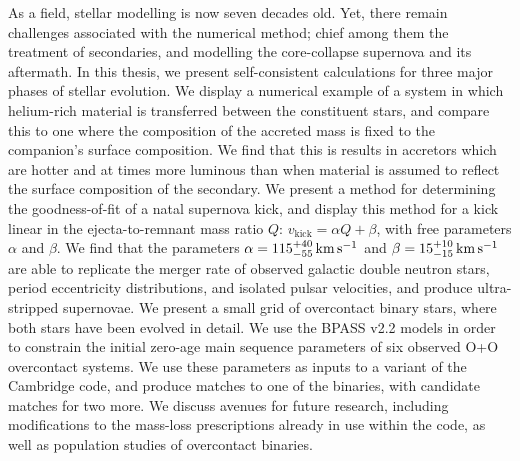 As a field, stellar modelling is now seven decades old. Yet, there remain challenges associated with the numerical method; chief among them the treatment of secondaries, and modelling the core-collapse supernova and its aftermath. In this thesis, we present self-consistent calculations for three major phases of stellar evolution. We display a numerical example of a system in which helium-rich material is transferred between the constituent stars, and compare this to one where the composition of the accreted mass is fixed to the companion's surface composition. We find that this is results in accretors which are hotter and at times more luminous than when material is assumed to reflect the surface composition of the secondary. We present a method for determining the goodness-of-fit of a natal supernova kick, and display this method for a kick linear in the ejecta-to-remnant mass ratio $Q$: $v_\text{kick}=\alpha Q + \beta$, with free parameters $\alpha$ and $\beta$. We find that the parameters $\alpha=\SI[parse-numbers=false]{115^{+40}_{-55}}{\kilo\meter\per\second}$ and $\beta=\SI[parse-numbers=false]{15^{+10}_{-15}}{\kilo\meter\per\second}$ are able to replicate the merger rate of observed galactic double neutron stars, period eccentricity distributions, and isolated pulsar velocities, and produce ultra-stripped supernovae. We present a small grid of overcontact binary stars, where both stars have been evolved in detail. We use the BPASS v2.2 models in order to constrain the initial zero-age main sequence parameters of six observed O+O overcontact systems. We use these parameters as inputs to a variant of the Cambridge  code, and produce matches to one of the binaries, with candidate matches for two more. We discuss avenues for future research, including modifications to the mass-loss prescriptions already in use within the code, as well as population studies of overcontact binaries.